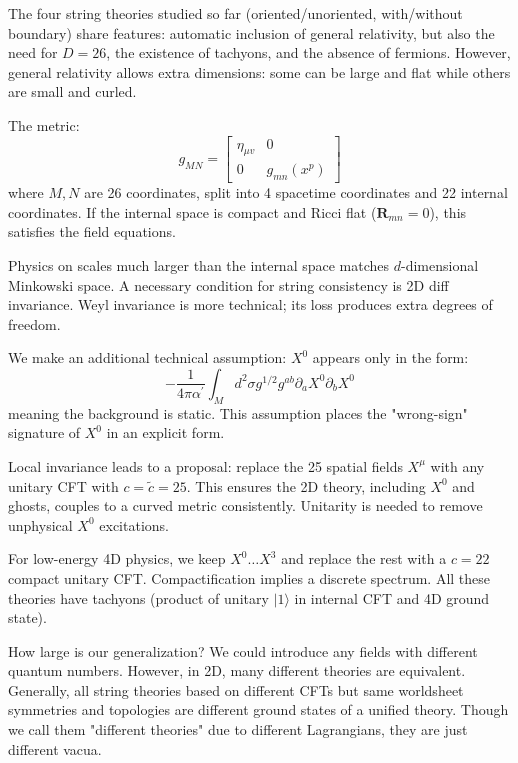 The four string theories studied so far (oriented/unoriented, with/without boundary) share features: automatic inclusion of general relativity, but also the need for $D=26$, the existence of tachyons, and the absence of fermions. However, general relativity allows extra dimensions: some can be large and flat while others are small and curled.

The metric:
\begin{equation}\label{3.7.29}
	g_{M N}=\left[\begin{array}{cc}
		\eta_{\mu v} & 0 \\
		0 & g_{m n}\left(x^{p}\right)
	\end{array}\right]
\end{equation}
where $M,N$ are 26 coordinates, split into 4 spacetime coordinates and 22 internal coordinates. If the internal space is compact and Ricci flat ($\mathbf{R}_{mn}=0$), this satisfies the field equations.

Physics on scales much larger than the internal space matches $d$-dimensional Minkowski space. A necessary condition for string consistency is 2D diff invariance. Weyl invariance is more technical; its loss produces extra degrees of freedom.

We make an additional technical assumption: $X^0$ appears only in the form:
\begin{equation}\label{3.7.30}
	-\frac{1}{4 \pi \alpha^{\prime}} \int_{M} d^{2} \sigma g^{1 / 2} g^{a b} \partial_{a} X^{0} \partial_{b} X^{0}
\end{equation}
meaning the background is static. This assumption places the "wrong-sign" signature of $X^0$ in an explicit form.

Local invariance leads to a proposal: replace the 25 spatial fields $X^\mu$ with any unitary CFT with $c = \tilde{c} = 25$. This ensures the 2D theory, including $X^0$ and ghosts, couples to a curved metric consistently. Unitarity is needed to remove unphysical $X^0$ excitations.

For low-energy 4D physics, we keep $X^0 \dots X^3$ and replace the rest with a $c=22$ compact unitary CFT. Compactification implies a discrete spectrum. All these theories have tachyons (product of unitary $|1\rangle$ in internal CFT and 4D ground state).

How large is our generalization? We could introduce any fields with different quantum numbers. However, in 2D, many different theories are equivalent. Generally, all string theories based on different CFTs but same worldsheet symmetries and topologies are different ground states of a unified theory. Though we call them "different theories" due to different Lagrangians, they are just different vacua.
